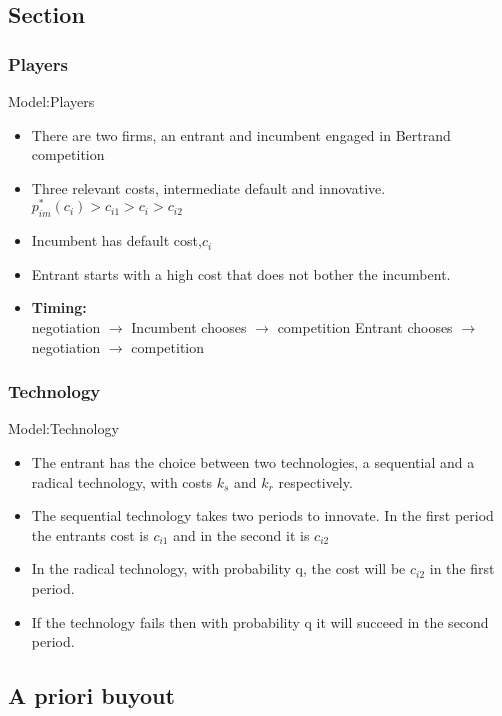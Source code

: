 \documentclass{beamer}
\begin{document}
\subsection{Section}
\subsubsection{Players}
\begin{frame}{Model:Players}
\begin{itemize}
    \item There are two firms, an entrant and incumbent engaged in Bertrand competition
    \item Three relevant costs, intermediate default and innovative. $p_{im}^*(c_i)>c_{i1}>c_i>c_{i2}$
    \item Incumbent has default cost,$c_i$
    \item Entrant starts with a high cost that does not bother the incumbent.
    \item \textbf{Timing:} \\
    negotiation $\rightarrow$  Incumbent chooses  $\rightarrow$ competition
    Entrant chooses $\rightarrow$ negotiation $\rightarrow$ competition
\end{itemize}
\end{frame}

\subsubsection{Technology}
\begin{frame}{Model:Technology}
\begin{itemize}
    \item The entrant has the choice between two technologies, a sequential and a radical technology, with costs $k_s$ and $k_r$ respectively.  
    \item The sequential technology takes two periods to innovate. In the first period the entrants cost is $c_{i1}$ and in the second it is $c_{i2}$
    \item In the radical technology, with probability q, the cost will be $c_{i2}$ in the first period.
    \item If the technology fails then with probability q it will succeed in the second period. 

\end{itemize}
\end{frame}

\subsection{A priori buyout}
\end{document}
